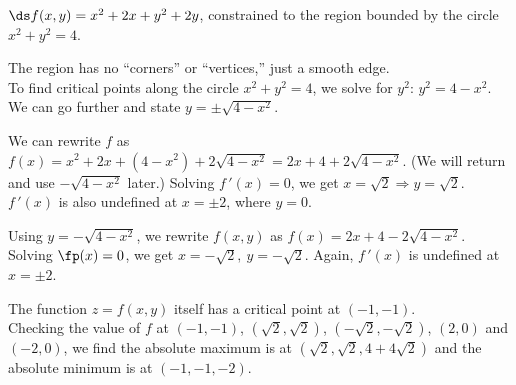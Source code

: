 {$\ds f(x,y) = x^2+2x+y^2+2y$, constrained to the region bounded by the circle $x^2+y^2=4$.
}
{The region has no ``corners'' or ``vertices,'' just a smooth edge.\\
To find critical points along the circle $x^2+y^2=4$, we solve for $y^2$: $y^2=4-x^2$. We can go further and state $y=\pm\sqrt{4-x^2}$. 

We can rewrite $f$ as $f(x)=x^2+2x + (4-x^2) + 2\sqrt{4-x^2} = 2x+4+2\sqrt{4-x^2}$. (We will return and use $-\sqrt{4-x^2}$ later.) Solving $f\,'(x)=0$, we get $x=\sqrt{2} \Rightarrow y=\sqrt{2}$. $f\,'(x)$ is also undefined at $x=\pm 2$, where $y=0$. 

Using $y=-\sqrt{4-x^2}$, we rewrite $f(x,y)$ as $f(x) = 2x+4-2\sqrt{4-x^2}$. Solving $\fp(x) =0$, we get $x=-\sqrt{2},\ y=-\sqrt{2}$. Again, $f\,'(x)$ is undefined at $x=\pm 2$.

The function $z=f(x,y)$ itself has a critical point at $(-1,-1)$. \\
Checking the value of $f$ at $(-1,-1)$, $(\sqrt{2},\sqrt{2})$, $(-\sqrt{2},-\sqrt{2})$, $(2,0)$ and $(-2,0)$, we find the absolute maximum is at $(\sqrt2,\sqrt2,4+4\sqrt2)$ and the absolute minimum is at $(-1,-1,-2)$.
}
